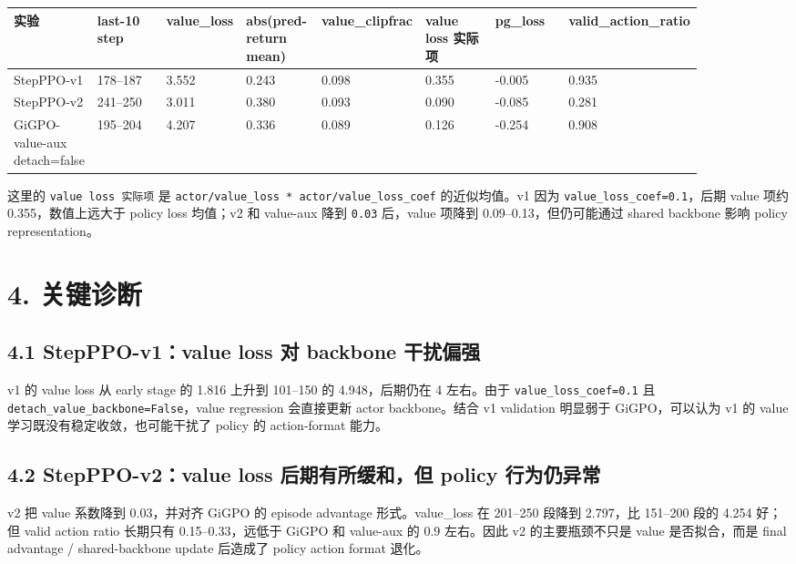 \documentclass[10pt]{ctexart}
\begin{document}
\begin{small}
\begin{longtable}{@{}p{0.11\linewidth}p{0.11\linewidth}p{0.11\linewidth}p{0.11\linewidth}p{0.11\linewidth}p{0.11\linewidth}p{0.11\linewidth}p{0.11\linewidth}@{}}
\toprule
实验 & last-10 step & value\_loss & abs(pred-return mean) & value\_clipfrac & value loss 实际项 & pg\_loss & valid\_action\_ratio \\
\midrule
StepPPO-v1 & 178--187 & 3.552 & 0.243 & 0.098 & 0.355 & -0.005 & 0.935 \\
StepPPO-v2 & 241--250 & 3.011 & 0.380 & 0.093 & 0.090 & -0.085 & 0.281 \\
GiGPO-value-aux detach=false & 195--204 & 4.207 & 0.336 & 0.089 & 0.126 & -0.254 & 0.908 \\
\bottomrule
\end{longtable}
\end{small}


这里的 \texttt{value loss 实际项} 是 \texttt{actor/value\_loss * actor/value\_loss\_coef} 的近似均值。v1 因为 \texttt{value\_loss\_coef=0.1}，后期 value 项约 0.355，数值上远大于 policy loss 均值；v2 和 value-aux 降到 \texttt{0.03} 后，value 项降到 0.09--0.13，但仍可能通过 shared backbone 影响 policy representation。

\section*{4. 关键诊断}

\subsection*{4.1 StepPPO-v1：value loss 对 backbone 干扰偏强}

v1 的 value loss 从 early stage 的 1.816 上升到 101--150 的 4.948，后期仍在 4 左右。由于 \texttt{value\_loss\_coef=0.1} 且 \texttt{detach\_value\_backbone=False}，value regression 会直接更新 actor backbone。结合 v1 validation 明显弱于 GiGPO，可以认为 v1 的 value 学习既没有稳定收敛，也可能干扰了 policy 的 action-format 能力。

\subsection*{4.2 StepPPO-v2：value loss 后期有所缓和，但 policy 行为仍异常}

v2 把 value 系数降到 0.03，并对齐 GiGPO 的 episode advantage 形式。value\_loss 在 201--250 段降到 2.797，比 151--200 段的 4.254 好；但 valid action ratio 长期只有 0.15--0.33，远低于 GiGPO 和 value-aux 的 0.9 左右。因此 v2 的主要瓶颈不只是 value 是否拟合，而是 final advantage / shared-backbone update 后造成了 policy action format 退化。
\end{document}
